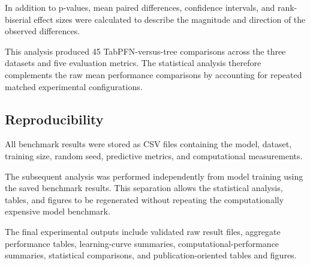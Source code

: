 In addition to p-values, mean paired differences, confidence intervals, and rank-biserial effect sizes were calculated to describe the magnitude and direction of the observed differences.

This analysis produced 45 TabPFN-versus-tree comparisons across the three datasets and five evaluation metrics. The statistical analysis therefore complements the raw mean performance comparisons by accounting for repeated matched experimental configurations.

\subsection{Reproducibility}\label{reproducibility}

All benchmark results were stored as CSV files containing the model, dataset, training size, random seed, predictive metrics, and computational measurements.

The subsequent analysis was performed independently from model training using the saved benchmark results. This separation allows the statistical analysis, tables, and figures to be regenerated without repeating the computationally expensive model benchmark.

The final experimental outputs include validated raw result files, aggregate performance tables, learning-curve summaries, computational-performance summaries, statistical comparisons, and publication-oriented tables and figures.
